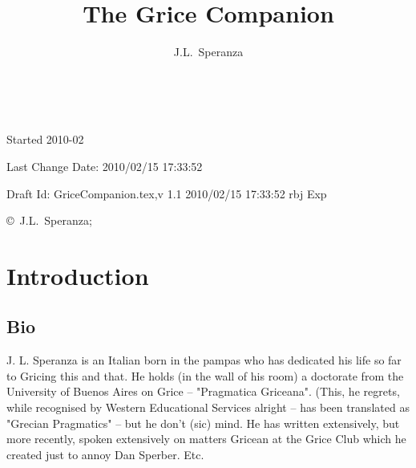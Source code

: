 \documentclass[10pt,titlepage]{book}
\title{The Grice Companion}
\author{J.L.~Speranza}
\date{\ }
\newcommand{\ignore}[1]{}
\begin{document}
\frontmatter
                               
\begin{titlepage}
\maketitle

\vfill


\vfill

\begin{centering}

\vfill

\footnotesize{
Started 2010-02

Last Change $ $Date: 2010/02/15 17:33:52 $ $


Draft $ $Id: GriceCompanion.tex,v 1.1 2010/02/15 17:33:52 rbj Exp $ $

\copyright\ J.L.~Speranza;

}%

\end{centering}

\end{titlepage}

\setcounter{tocdepth}{4}
{\parskip-0pt\tableofcontents}

\mainmatter

\ignore{Bibliography test:
\cite{grice41}
\cite{grice86}
\cite{grice87}
\cite{grice88}
\cite{grice89}
\cite{grice91}
\cite{grice01}
\cite{grice57}
\cite{speranza89}
\cite{speranza91a}
\cite{speranza91b}
\cite{speranza95}
}%

\chapter{Introduction}

\section{Bio}

J. L. Speranza is an Italian born in the pampas who has dedicated his life  
so far to Gricing this and that. He holds (in the wall of his room) a 
doctorate  from the University of Buenos Aires on Grice -- "Pragmatica Griceana". 
(This, he  regrets, while recognised by Western Educational Services 
alright -- has been  translated as "Grecian Pragmatics" -- but he don't (sic) 
mind.  He has  written extensively, but more recently, spoken extensively on 
matters Gricean at  the Grice Club which he created just to annoy Dan Sperber.  
Etc.
\end{document}
